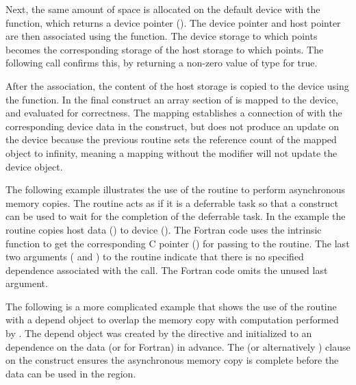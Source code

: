 Next, the same amount of space is allocated on the default device with
the  function, which returns a device pointer ().
The device pointer  and host pointer 
are then associated using the  function.
The device storage to which  points becomes the corresponding storage of
the host storage to which  points.
The following  call confirms this, by returning
a non-zero value of  type for true.

After the association, the content of the host storage
is copied to the device using the  function.
In the final  construct an array section of  
is mapped to the device, and evaluated for correctness.
The mapping establishes a connection of  with
the corresponding device data in the  construct,
but does not produce an update on the device because the previous  routine sets the 
reference count of the mapped object to infinity, meaning a mapping 
without the  modifier will not 
update the device object.


The following example illustrates the use of the 
routine to perform asynchronous memory copies.
The routine acts as if it is a deferrable task so that
a  construct can be used to wait for the completion
of the deferrable task.
In the example the  routine copies host data 
() to device ().
The Fortran code uses the intrinsic  function to get
the corresponding C pointer () for
passing to the  routine.
The last two arguments ( and ) to the routine
indicate that there is no specified dependence associated with the call.
The Fortran code omits the unused last argument.


The following is a more complicated example that shows the use of 
the  routine with a depend object  to 
overlap the memory copy with computation performed by .
The depend object  was created by the  directive
and initialized to an  dependence on the data  
(or  for Fortran) in advance.
The  (or alternatively 
) clause on the  construct
ensures the asynchronous memory copy is complete before the data 
can be used in the  region.


